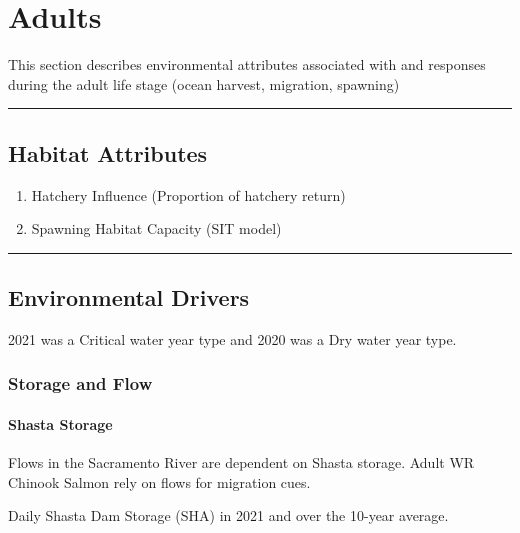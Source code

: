 \documentclass[
]{book}
\theoremstyle{definition}
\theoremstyle{definition}
\theoremstyle{definition}
\theoremstyle{definition}
\theoremstyle{remark}
\begin{document}
\hypertarget{adults}{%
\chapter{Adults}\label{adults}}

This section describes environmental attributes associated with and responses during the adult life stage (ocean harvest, migration, spawning)

\begin{center}\rule{0.5\linewidth}{0.5pt}\end{center}

\hypertarget{habitat-attributes}{%
\section{Habitat Attributes}\label{habitat-attributes}}

\begin{enumerate}
\def\labelenumi{\arabic{enumi}.}
\item
  Hatchery Influence (Proportion of hatchery return)
\item
  Spawning Habitat Capacity (SIT model)
\end{enumerate}

\begin{center}\rule{0.5\linewidth}{0.5pt}\end{center}

\hypertarget{wq}{%
\section{Environmental Drivers}\label{wq}}

2021 was a Critical water year type and 2020 was a Dry water year type.

\hypertarget{storage-and-flow}{%
\subsection{Storage and Flow}\label{storage-and-flow}}

\hypertarget{shasta-storage}{%
\subsubsection{Shasta Storage}\label{shasta-storage}}

Flows in the Sacramento River are dependent on Shasta storage. Adult WR Chinook Salmon rely on flows for migration cues.

\label{fig:SHAstor-fig}Daily Shasta Dam Storage (SHA) in 2021 and over the 10-year average.
\end{document}
